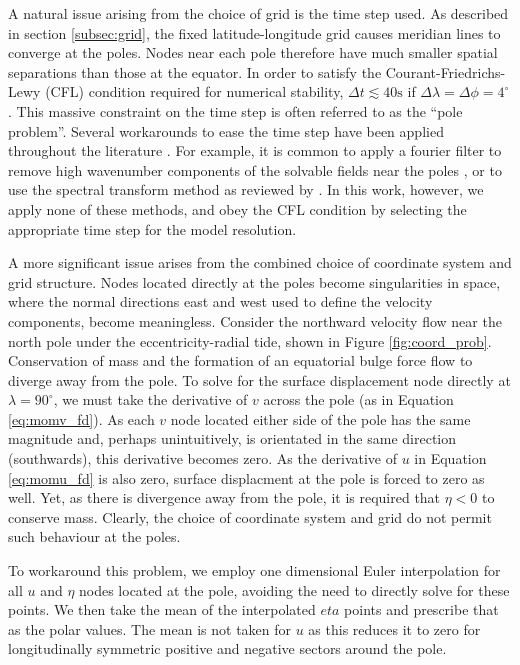 A natural issue arising from the choice of grid is the time step used. As described in section \ref{subsec:grid}, the fixed latitude-longitude grid causes meridian lines to converge at the poles. Nodes near each pole therefore have much smaller spatial separations than those at the equator. In order to satisfy the Courant-Friedrichs-Lewy (CFL) condition required for numerical stability, $\Delta t \lesssim 40 \si{\second}$ if $\Delta \lambda = \Delta \phi = 4^{\circ}$ \citep{arakawa1977computational,sears1995tidal}. This massive constraint on the time step is often referred to as the ``pole problem''. Several workarounds to ease the time step have been applied throughout the literature \citep{comblen2009finite}. For example, it is common to apply a fourier filter to remove high wavenumber components of the solvable fields near the poles \citep{murray2002fourier}, or to use the spectral transform method as reviewed by \citet{swarztrauber1996spectral}. In this work, however, we apply none of these methods, and obey the CFL condition by selecting the appropriate time step for the model resolution.

A more significant issue arises from the combined choice of coordinate system and grid structure. Nodes located directly at the poles become singularities in space, where the normal directions east and west used to define the velocity components, become meaningless. Consider the northward velocity flow near the north pole under the eccentricity-radial tide, shown in Figure \ref{fig:coord_prob}. Conservation of mass and the formation of an equatorial bulge force flow to diverge away from the pole. To solve for the surface displacement node directly at $\lambda = 90^{\circ}$, we must take the derivative of $v$ across the pole (as in Equation \ref{eq:momv_fd}). As each $v$ node located either side of the pole has the same magnitude and, perhaps unintuitively, is orientated in the same direction (southwards), this derivative becomes zero. As the derivative of $u$ in Equation \ref{eq:momu_fd} is also zero, surface displacment at the pole is forced to zero as well. Yet, as there is divergence away from the pole, it is required that $\eta < 0$ to conserve mass. Clearly, the choice of coordinate system and grid do not permit such behaviour at the poles. 

To workaround this problem, we employ one dimensional Euler interpolation for all $u$ and $\eta$ nodes located at the pole, avoiding the need to directly solve for these points. We then take the mean of the interpolated $eta$ points and prescribe that as the polar values. The mean is not taken for $u$ as this reduces it to zero for longitudinally symmetric positive and negative sectors around the pole.

